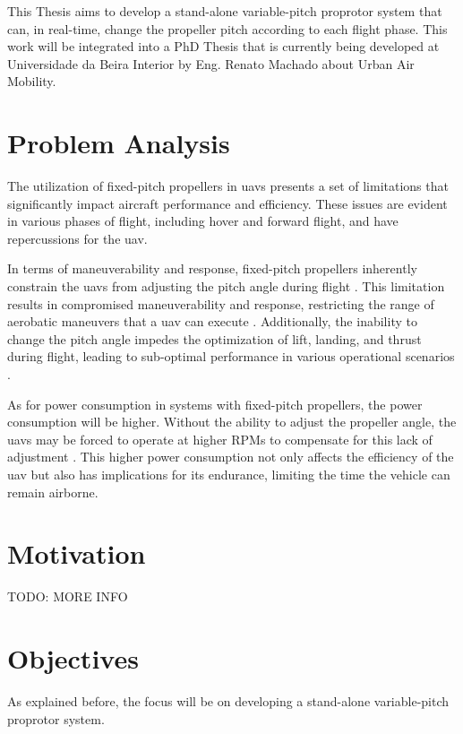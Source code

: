 This Thesis aims to develop a stand-alone variable-pitch proprotor system that can, in real-time, change the propeller pitch according to each flight phase.
This work will be integrated into a PhD Thesis that is currently being developed at Universidade da Beira Interior by Eng. Renato Machado about Urban Air Mobility.


\section{Problem Analysis}
The utilization of fixed-pitch propellers in \glspl{uav} presents a set of limitations that significantly impact aircraft performance and efficiency.
These issues are evident in various phases of flight, including hover and forward flight, and have repercussions for the \gls{uav}.

In terms of maneuverability and response, fixed-pitch propellers inherently constrain the \glspl{uav} from adjusting the pitch angle during flight \cite{FPP1}.
This limitation results in compromised maneuverability and response, restricting the range of aerobatic maneuvers that a \gls{uav} can execute \cite{FPP1}.
Additionally, the inability to change the pitch angle impedes the optimization of lift, landing, and thrust during flight, leading to sub-optimal performance in various operational scenarios \cite{FPP1}.

As for power consumption in systems with fixed-pitch propellers, the power consumption will be higher.
Without the ability to adjust the propeller angle, the \glspl{uav} may be forced to operate at higher \glspl{RPM} to compensate for this lack of adjustment \cite{FPP1}.
This higher power consumption not only affects the efficiency of the \gls{uav} but also has implications for its endurance, limiting the time the vehicle can remain airborne.



\section{Motivation}
TODO: MORE INFO


\section{Objectives}
As explained before, the focus will be on developing a stand-alone variable-pitch proprotor system.

